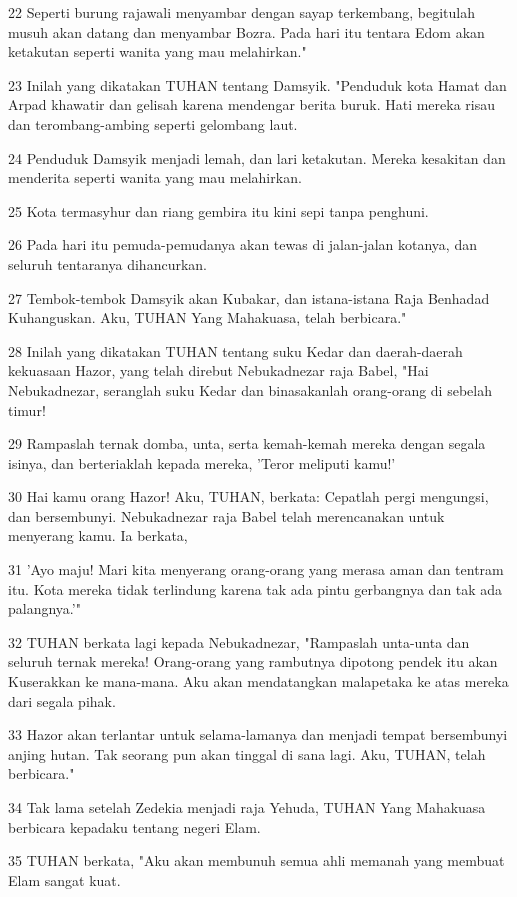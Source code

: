 \par 22 Seperti burung rajawali menyambar dengan sayap terkembang, begitulah musuh akan datang dan menyambar Bozra. Pada hari itu tentara Edom akan ketakutan seperti wanita yang mau melahirkan."
\par 23 Inilah yang dikatakan TUHAN tentang Damsyik. "Penduduk kota Hamat dan Arpad khawatir dan gelisah karena mendengar berita buruk. Hati mereka risau dan terombang-ambing seperti gelombang laut.
\par 24 Penduduk Damsyik menjadi lemah, dan lari ketakutan. Mereka kesakitan dan menderita seperti wanita yang mau melahirkan.
\par 25 Kota termasyhur dan riang gembira itu kini sepi tanpa penghuni.
\par 26 Pada hari itu pemuda-pemudanya akan tewas di jalan-jalan kotanya, dan seluruh tentaranya dihancurkan.
\par 27 Tembok-tembok Damsyik akan Kubakar, dan istana-istana Raja Benhadad Kuhanguskan. Aku, TUHAN Yang Mahakuasa, telah berbicara."
\par 28 Inilah yang dikatakan TUHAN tentang suku Kedar dan daerah-daerah kekuasaan Hazor, yang telah direbut Nebukadnezar raja Babel, "Hai Nebukadnezar, seranglah suku Kedar dan binasakanlah orang-orang di sebelah timur!
\par 29 Rampaslah ternak domba, unta, serta kemah-kemah mereka dengan segala isinya, dan berteriaklah kepada mereka, 'Teror meliputi kamu!'
\par 30 Hai kamu orang Hazor! Aku, TUHAN, berkata: Cepatlah pergi mengungsi, dan bersembunyi. Nebukadnezar raja Babel telah merencanakan untuk menyerang kamu. Ia berkata,
\par 31 'Ayo maju! Mari kita menyerang orang-orang yang merasa aman dan tentram itu. Kota mereka tidak terlindung karena tak ada pintu gerbangnya dan tak ada palangnya.'"
\par 32 TUHAN berkata lagi kepada Nebukadnezar, "Rampaslah unta-unta dan seluruh ternak mereka! Orang-orang yang rambutnya dipotong pendek itu akan Kuserakkan ke mana-mana. Aku akan mendatangkan malapetaka ke atas mereka dari segala pihak.
\par 33 Hazor akan terlantar untuk selama-lamanya dan menjadi tempat bersembunyi anjing hutan. Tak seorang pun akan tinggal di sana lagi. Aku, TUHAN, telah berbicara."
\par 34 Tak lama setelah Zedekia menjadi raja Yehuda, TUHAN Yang Mahakuasa berbicara kepadaku tentang negeri Elam.
\par 35 TUHAN berkata, "Aku akan membunuh semua ahli memanah yang membuat Elam sangat kuat.
